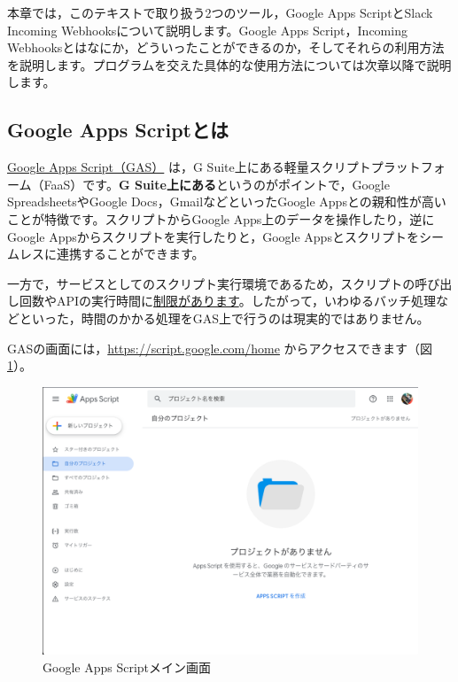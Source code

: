 \documentclass[uplatex,a4j]{jsarticle}
\begin{document}
本章では，このテキストで取り扱う2つのツール，Google Apps ScriptとSlack Incoming Webhooksについて説明します。Google Apps Script，Incoming Webhooksとはなにか，どういったことができるのか，そしてそれらの利用方法を説明します。プログラムを交えた具体的な使用方法については次章以降で説明します。

\subsection{Google Apps Scriptとは}
\label{subsec:About GAS}

\href{https://developers.google.com/apps-script/}{Google Apps Script（GAS）} は，G Suite上にある軽量スクリプトプラットフォーム（FaaS）です。\textbf{G Suite上にある}というのがポイントで，Google SpreadsheetsやGoogle Docs，GmailなどといったGoogle Appsとの親和性が高いことが特徴です。スクリプトからGoogle Apps上のデータを操作したり，逆にGoogle Appsからスクリプトを実行したりと，Google Appsとスクリプトをシームレスに連携することができます。

一方で，サービスとしてのスクリプト実行環境であるため，スクリプトの呼び出し回数やAPIの実行時間に\href{https://developers.google.com/apps-script/guides/services/quotas}{制限があります}。したがって，いわゆるバッチ処理などといった，時間のかかる処理をGAS上で行うのは現実的ではありません。


GASの画面には，\href{https://script.google.com/home}{https://script.google.com/home} からアクセスできます（図\ref{fig:gas_main}）。
\begin{figure}[H]
 \centering
 \includegraphics[keepaspectratio, scale=0.4]{images/gas_main.png}
 \caption{Google Apps Scriptメイン画面}
 \label{fig:gas_main}
\end{figure}
\end{document}
